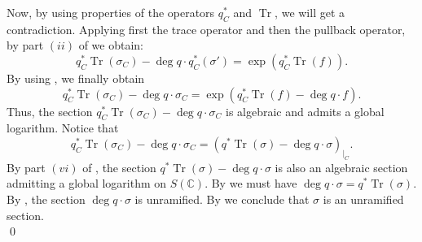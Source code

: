 \documentclass[10 pt,a4paper]{article}
\theoremstyle{plain}
\theoremstyle{definition}
\theoremstyle{named}
\DeclareMathOperator{\Tr}{Tr}
\newcommand{\bC}{\mathbb C}
\begin{document}
	Now, by using properties of the operators $q_C^*$ and $\Tr$, we will get a contradiction. Applying first the trace operator and then the pullback operator, by part $(ii)$ of  we obtain:
    \[
    q^*_C\Tr(\sigma_C) - \deg{q}\cdot q^*_C(\sigma')=\exp(q^*_C\Tr(f)).
    \]
    By using , we finally obtain
    \[
    q^*_C\Tr(\sigma_C)-\deg{q}\cdot \sigma_C = \exp(q^*_C\Tr(f)-\deg{q}\cdot f).
    \]
    Thus, the section $q^*_C\Tr(\sigma_C)-\deg{q}\cdot \sigma_C$ is algebraic and admits a global logarithm. Notice that
    \[
    q^*_C\Tr(\sigma_C)-\deg{q}\cdot \sigma_C = (q^*\Tr(\sigma)-\deg{q}\cdot \sigma)_{|_C}.
    \]
    By part $(vi)$ of , the section $q^*\Tr(\sigma)-\deg{q}\cdot \sigma$ is also an algebraic section admitting a global logarithm on $S(\bC)$. By  we must have $\deg{q}\cdot\sigma=q^*\Tr(\sigma)$. By , the section $\deg{q}\cdot\sigma$ is unramified. By  we conclude that $\sigma$ is an unramified section.\\
    \qed


\end{document}
